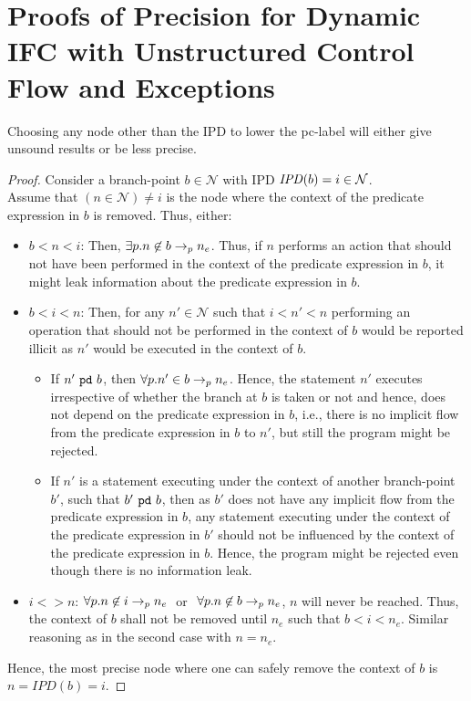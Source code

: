 \clearpage
\section{Proofs of Precision for Dynamic IFC with Unstructured Control
  Flow and Exceptions}
\label{app:exc-pre}
\begin{myThm}[Precision]\label{app:thm1:exc}
Choosing any node other than the IPD to lower the pc-label will either
give unsound results or be less precise.
\end{myThm}
\begin{proof}
Consider a branch-point $b \in \mathcal{N}$ with IPD $\mathit{IPD}(b) = i \in
\mathcal{N}$. \\ 
Assume that $(n \in \mathcal{N} )\neq i$ is the node where the context 
of the predicate expression in $b$ is removed. Thus, either:
\begin{itemize}
\item $b < n < i$: Then, $\exists p. n \not\in b \rightarrow_p n_e$. Thus,
  if $n$ performs an action that should not 
  have been performed in the context of the predicate expression in
  $b$, it might leak information about the predicate expression in
  $b$. 
\item $b < i < n$: Then, for any $n' \in \mathcal{N}$ such that  $i <
  n' < n$ performing an operation that should not be performed in the context of $b$ would
  be reported illicit as $n'$ would be executed in the context of
  $b$. 
\begin{itemize}
\item   If $n'~\texttt{pd}~b$, then $\forall p. n' \in b \rightarrow_p n_e$. Hence, the
      statement $n'$ executes   irrespective of whether 
      the branch at $b$ is taken or not and hence,   does not depend on
      the predicate expression in $b$, i.e., there is   no implicit flow
      from the predicate expression in $b$ to $n'$, but still the
      program might be rejected. 
\item   If $n'$ is a statement executing under the context of another
      branch-point $b'$, such that $b'~\texttt{pd}~b$, then as $b'$ does
      not have any implicit flow from the predicate expression in $b$, any
      statement executing under the context of the predicate expression in
      $b'$ should not be influenced by the context of the predicate
      expression in $b$. Hence, the program might be rejected even though
      there is no information leak.
\end{itemize} 
\item $i <> n$: $\forall p.n \not\in i \rightarrow_p n_e~$ or $~\forall p.n
  \not\in b \rightarrow_p n_e$, $n$ will never be reached. Thus, the context
  of $b$ shall not be removed until $n_e$ such that $b < i <
  n_e$. Similar reasoning as  in the second case with $n = n_e$.
\end{itemize} 
 Hence, the most precise node where one can safely remove the context of
$b$ is $n =\mathit{IPD}(b) = i$.
\end{proof}

